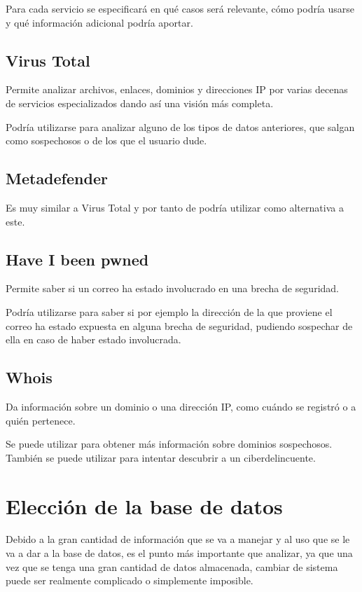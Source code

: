 Para cada servicio se especificará en qué casos será relevante, cómo podría usarse y qué información adicional podría aportar.

\subsection{Virus Total}
Permite analizar archivos, enlaces, dominios y direcciones IP por varias decenas de servicios especializados dando así una visión más completa. 

Podría utilizarse para analizar alguno de los tipos de datos anteriores, que salgan como sospechosos o de los que el usuario dude.

\subsection{Metadefender}
Es muy similar a Virus Total y por tanto de podría utilizar como alternativa a este. 

\subsection{Have I been pwned}
Permite saber si un correo ha estado involucrado en una brecha de seguridad. 

Podría utilizarse para saber si por ejemplo la dirección de la que proviene el correo ha estado expuesta en alguna brecha de seguridad, pudiendo sospechar de ella en caso de haber estado involucrada. 

\subsection{Whois}
Da información sobre un dominio o una dirección IP, como cuándo se registró o a quién pertenece.

Se puede utilizar para obtener más información sobre dominios sospechosos. También se puede utilizar para intentar descubrir a un ciberdelincuente. 

\section{Elección de la base de datos}
Debido a la gran cantidad de información que se va a manejar y al uso que se le va a dar a la base de datos, es el punto más importante que analizar, ya que una vez que se tenga una gran cantidad de datos almacenada, cambiar de sistema puede ser realmente complicado o simplemente imposible. 


